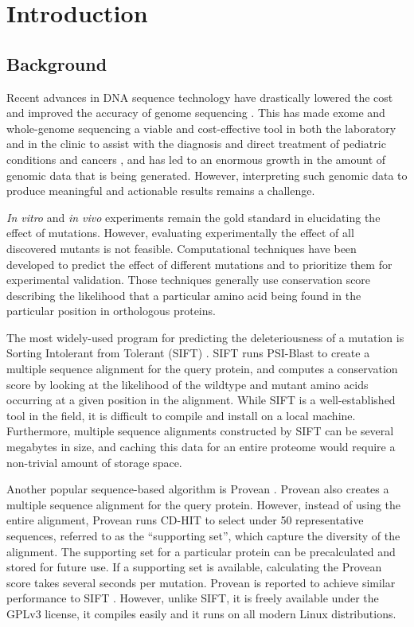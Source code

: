 
\chapter{Introduction} \label{ch:introduction}

\section{Background}

Recent advances in DNA sequence technology have drastically lowered the cost and improved the accuracy of genome sequencing \cite{wetterstrand_dna_2016}. This has made exome and whole-genome sequencing a viable and cost-effective tool in both the laboratory and in the clinic to assist with the diagnosis and direct treatment of pediatric conditions \cite{chrystoja_whole_2014} and cancers \cite{nik-zainal_landscape_2016}, and has led to an enormous growth in the amount of genomic data that is being generated. However, interpreting such genomic data to produce meaningful and actionable results remains a challenge.

\textit{In vitro} and \textit{in vivo} experiments remain the gold standard in elucidating the effect of mutations. However, evaluating experimentally the effect of all discovered mutants is not feasible. Computational techniques have been developed to predict the effect of different mutations and to prioritize them for experimental validation. Those techniques generally use conservation score describing the likelihood that a particular amino acid being found in the particular position in orthologous proteins.

The most widely-used program for predicting the deleteriousness of a mutation is Sorting Intolerant from Tolerant (SIFT) \cite{ng_sift:_2003}. SIFT runs PSI-Blast to create a multiple sequence alignment for the query protein, and computes a conservation score by looking at the likelihood of the wildtype and mutant amino acids occurring at a given position in the alignment. While SIFT is a well-established tool in the field, it is difficult to compile and install on a local machine. Furthermore, multiple sequence alignments constructed by SIFT can be several megabytes in size, and caching this data for an entire proteome would require a non-trivial amount of storage space.

Another popular sequence-based algorithm is Provean \cite{choi_predicting_2012}. Provean also creates a multiple sequence alignment for the query protein. However, instead of using the entire alignment, Provean runs CD-HIT to select under 50 representative sequences, referred to as the ``supporting set'', which capture the diversity of the alignment. The supporting set for a particular protein can be precalculated and stored for future use. If a supporting set is available, calculating the Provean score takes several seconds per mutation. Provean is reported to achieve similar performance to SIFT \cite{choi_predicting_2012}. However, unlike SIFT, it is freely available under the GPLv3 license, it compiles easily and it runs on all modern Linux distributions.


